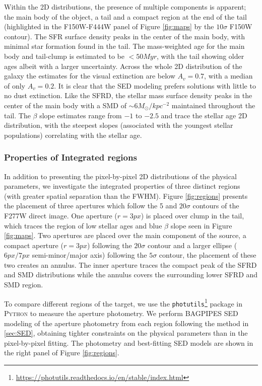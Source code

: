 \documentclass[sn-mathphys]{sn-jnl}%
\theoremstyle{thmstyleone}%
\theoremstyle{thmstyletwo}%
\theoremstyle{thmstylethree}%
\begin{document}
Within the 2D distributions, the presence of multiple components is apparent; the main body of the object, a tail and a compact region at the end of the tail (highlighted in the F150W-F444W panel of Figure \ref{fig:maps} by the $10\sigma$ F150W contour). 
The SFR surface density peaks in the center of the main body, with minimal star formation found in the tail. 
The mass-weighted age for the main body and tail-clump is estimated to be $<50Myr$, with the tail showing older ages albeit with a larger uncertainty. 
Across the whole 2D distribution of the galaxy the estimates for the visual extinction are below $A_v=0.7$, with a median of only $A_v=0.2$. It is clear that the SED modeling prefers solutions with little to no dust extinction.
Like the SFRD, the stellar mass surface density peaks in the center of the main body with a SMD of $\sim6M_\odot/kpc^{-2}$ maintained throughout the tail. 
The $\beta$ slope estimates range from $-1$ to $-2.5$ and trace the stellar age 2D distribution, with the steepest slopes (associated with the youngest stellar populations) correlating with the stellar age. 

\subsubsection{Properties of Integrated regions}\label{sec:SED_regions}

In addition to presenting the pixel-by-pixel 2D distributions of the physical parameters, we investigate the integrated properties of three distinct regions (with greater spatial separation than the FWHM). Figure \ref{fig:regions} presents the placement of three apertures which follow the 5 and $20\sigma$ contours of the F277W direct image. One aperture ($r=3px$) is placed over clump in the tail, which traces the region of low stellar ages and blue $\beta$ slope seen in Figure \ref{fig:maps}. Two apertures are placed over the main component of the source, a compact aperture ($r=3px$) following the $20\sigma$ contour and a larger ellipse ($6px/7px$ semi-minor/major axis) following the $5\sigma$ contour, the placement of these two creates an annulus. The inner aperture traces the compact peak of the SFRD and SMD distributions while the annulus covers the surrounding lower SFRD and SMD region.

To compare different regions of the target, we use the
\texttt{photutils}\footnote{\url{https://photutils.readthedocs.io/en/stable/index.html}} package in \textsc{Python} to measure the aperture photometry.
We perform BAGPIPES SED modeling of the aperture photometry from each region following the method in \ref{sec:SED}, obtaining tighter constraints on the physical parameters than in the pixel-by-pixel fitting. The photometry and best-fitting SED models are shown in the right panel of Figure \ref{fig:regions}.
\end{document}
